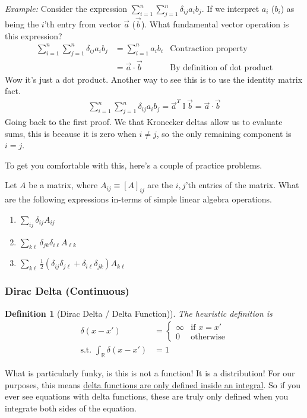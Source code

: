 \documentclass[12pt,fleqn]{article}
\numberwithin{equation}{section} %
\newtheorem{definition}{Definition}
\newcounter{problem}
\begin{document}
\begin{sidework}
	\emph{Example:} Consider the expression $\sum_{i=1}^n \sum_{j=1}^n \delta_{ij} a_i b_j$. If we interpret $a_i$ ($b_i$) as being the $i$'th entry from vector $\vec a$ ($\vec b$). What fundamental vector operation is this expression?
\begin{align}
	\sum_{i=1}^n \sum_{j=1}^n \delta_{ij} a_i b_j & = \sum_{i=1}^n a_i b_i & \text{Contraction property} \\
	& = \vec a \cdot \vec b & \text{By definition of dot product}
\end{align}
Wow it's just a dot product. Another way to see this is to use the identity matrix fact.
\begin{align}
	\sum_{i=1}^n \sum_{j=1}^n \delta_{ij} a_i b_j = \vec a^T ~\mathbb I ~\vec b = \vec a \cdot \vec b
\end{align}
Going back to the first proof. We that Kronecker deltas allow us to evaluate sums, this is because it is zero when $i \neq j$, so the only remaining component is $i= j$.
\end{sidework}
To get you comfortable with this, here's a couple of practice problems.
\begin{problem}
	Let $A$ be a matrix, where $A_{ij} \equiv [A]_{ij}$ are the $i,j$'th entries of the matrix. What are the following expressions in-terms of simple linear algebra operations.
	\begin{enumerate}
		\item $\sum_{ij} \delta_{ij} A_{ij}$ 
		\item $\sum_{k\ell} \delta_{jk} \delta_{i \ell} A_{\ell k}$
		\item $\sum_{k\ell} \frac{1}{2} (\delta_{ij} \delta_{j\ell} + \delta_{i \ell} \delta_{jk}) A_{k\ell} $
	\end{enumerate}
\end{problem}


\subsubsection{Dirac Delta (Continuous)}
\begin{definition}
	[Dirac Delta / Delta Function)] The heuristic definition is
	\begin{align}
		\delta(x-x') & = \begin{cases}
			\infty & \text{if } x = x'\\
			0 & \text{otherwise}
		\end{cases}\\
		\text{s.t. } \int_{\mathbb R} \delta(x-x')  & = 1
	\end{align}
\end{definition}
What is particularly funky, is this is not a function! It is a distribution! For our purposes, this means \underline{delta functions are only defined inside an integral}. So if you ever see equations with delta functions, these are truly only defined when you integrate both sides of the equation.
\end{document}
